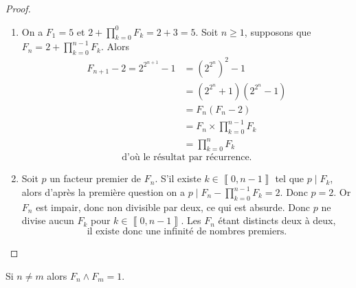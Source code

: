 \begin{proof}
	\phantom{}
	\begin{enumerate}
		\item On a $F_{1}=5$ et $2+\prod_{k=0}^{0}F_{k}=2+3=5$. Soit $n\geqslant1$, supposons que $F_{n}=2+\prod_{k=0}^{n-1}F_{k}$. Alors 
		\begin{align}
			F_{n+1}-2=2^{2^{n+1}}-1
			&=(2^{2^{n}})^{2}-1\\
			&=(2^{2^{n}}+1)(2^{2^{n}}-1)\\
			&=F_{n}(F_{n}-2)\\
			&=F_{n}\times\prod_{k=0}^{n-1}F_{k}\\
			&=\prod_{k=0}^{n}F_{k}
		\end{align}
		\begin{equation}
			\boxed{\text{d'où le résultat par récurrence.}}
		\end{equation}
		

		\item Soit $p$ un facteur premier de $F_{n}$. S'il existe $k\in\left\llbracket 0,n-1\right\rrbracket$ tel que $p\mid F_{k}$, alors d'après la première question on a $p\mid F_{n}-\prod_{k=0}^{n-1}F_{k}=2$. Donc $p=2$. Or $F_{n}$ est impair, donc non divisible par deux, ce qui est absurde. Donc $p$ ne divise aucun $F_{k}$ pour $k\in\left\llbracket 0,n-1\right\rrbracket$. Les $F_{n}$	 étant distincts deux à deux,
		\begin{equation}
			\boxed{\text{il existe donc une infinité de nombres premiers.}}
		\end{equation}
	\end{enumerate}
\end{proof}

\begin{remark}
	Si $n\neq m$ alors $F_{n}\wedge F_{m}=1$.
\end{remark}

